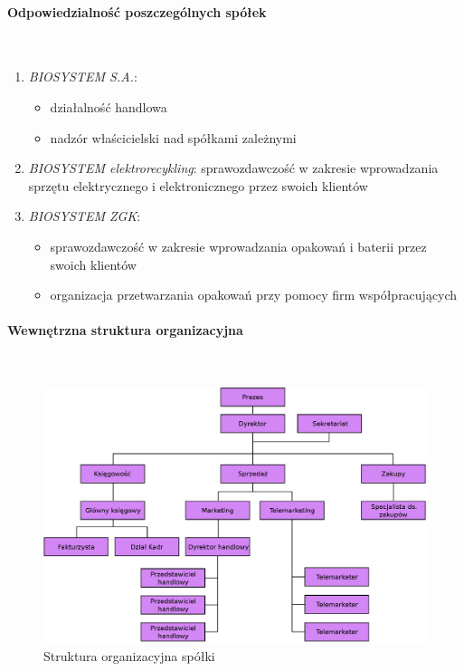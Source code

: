 \paragraph{Odpowiedzialność poszczególnych spółek} \ \\
\begin{enumerate}
	\item \emph{BIOSYSTEM S.A.}: 
		\begin{itemize}
			\item działalność handlowa
			\item nadzór właścicielski nad spółkami zależnymi
		\end{itemize}
	\item \emph{BIOSYSTEM elektrorecykling}: sprawozdawczość w zakresie wprowadzania sprzętu elektrycznego i elektronicznego przez swoich klientów
	\item \emph{BIOSYSTEM ZGK}:
		\begin{itemize}
			\item sprawozdawczość w zakresie wprowadzania opakowań i baterii przez swoich klientów
			\item organizacja przetwarzania opakowań przy pomocy firm współpracujących
		\end{itemize}
\end{enumerate}

\paragraph{Wewnętrzna struktura organizacyjna} \ \\

\begin{figure}[H]
    \centering
    \includegraphics[width=1\textwidth]{img/organization_chart.eps}
    \caption{Struktura organizacyjna spółki}
\end{figure}